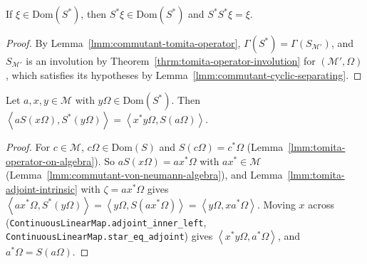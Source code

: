 \begin{lemma}[$S^*$ is an Involution]
    \label{lmm:tomita-adjoint-involution}
    \leanok
    If $\xi \in \text{Dom}(S^*)$, then $S^*\xi \in \text{Dom}(S^*)$ and $S^*S^*\xi = \xi$.
\end{lemma}
\begin{proof}
    \leanok
    By Lemma~\ref{lmm:commutant-tomita-operator}, $\Gamma(S^*) = \Gamma(S_{\mathcal{M}'})$, and $S_{\mathcal{M}'}$ is an involution by Theorem~\ref{thrm:tomita-operator-involution} for $(\mathcal{M}', \Omega)$, which satisfies its hypotheses by Lemma~\ref{lmm:commutant-cyclic-separating}.
\end{proof}

\begin{lemma}
    \label{lmm:van-daele-first-term}
    \leanok
    Let $a, x, y \in \mathcal{M}$ with $y\Omega \in \text{Dom}(S^*)$. Then $\left< aS(x\Omega), S^*(y\Omega) \right> = \left< x^*y\Omega, S(a\Omega) \right>$.
\end{lemma}
\begin{proof}
    \leanok
    For $c \in \mathcal{M}$, $c\Omega \in \text{Dom}(S)$ and $S(c\Omega) = c^*\Omega$ (Lemma~\ref{lmm:tomita-operator-on-algebra}). So $aS(x\Omega) = ax^*\Omega$ with $ax^* \in \mathcal{M}$ (Lemma~\ref{lmm:commutant-von-neumann-algebra}), and Lemma~\ref{lmm:tomita-adjoint-intrinsic} with $\zeta = ax^*\Omega$ gives $\left< ax^*\Omega, S^*(y\Omega) \right> = \left< y\Omega, S(ax^*\Omega) \right> = \left< y\Omega, xa^*\Omega \right>$. Moving $x$ across (\texttt{ContinuousLinearMap.adjoint\_inner\_left}, \texttt{ContinuousLinearMap.star\_eq\_adjoint}) gives $\left< x^*y\Omega, a^*\Omega \right>$, and $a^*\Omega = S(a\Omega)$.
\end{proof}

